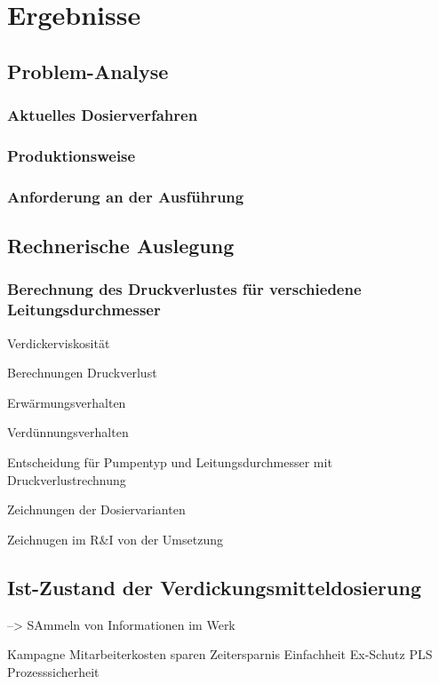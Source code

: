 \newpage
\section{Ergebnisse}
\label{sec:ergebnisse}

\subsection{Problem-Analyse}
\subsubsection{Aktuelles Dosierverfahren}
\subsubsection{Produktionsweise}
\subsubsection{Anforderung an der Ausführung}

\subsection{Rechnerische Auslegung}
\subsubsection{Berechnung des Druckverlustes für verschiedene Leitungsdurchmesser}


Verdickerviskosität

Berechnungen Druckverlust

Erwärmungsverhalten

Verdünnungsverhalten

Entscheidung für Pumpentyp und Leitungsdurchmesser mit Druckverlustrechnung 

Zeichnungen der Dosiervarianten

Zeichnugen im R\&I von der Umsetzung


\subsection{Ist-Zustand der Verdickungsmitteldosierung}
--> SAmmeln von Informationen im Werk

Kampagne
Mitarbeiterkosten sparen
Zeitersparnis
Einfachheit
Ex-Schutz
PLS
Prozesssicherheit

